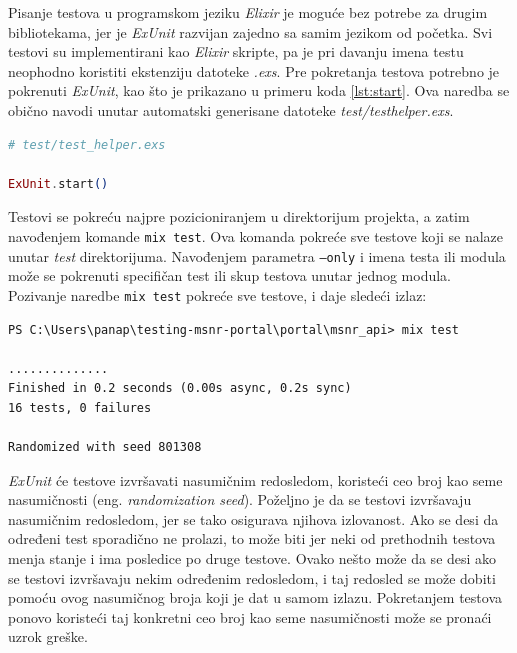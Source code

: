 \documentclass[12pt,oneside]{memoir}
\begin{document}
\par Pisanje testova u programskom jeziku \emph{Elixir} je moguće bez potrebe za drugim bibliotekama, jer je \emph{ExUnit} razvijan zajedno sa samim jezikom od početka. Svi testovi su implementirani kao \emph{Elixir} skripte, pa je pri davanju imena testu neophodno koristiti ekstenziju datoteke \emph{.exs}. Pre pokretanja testova potrebno je pokrenuti \emph{ExUnit}, kao što je prikazano u primeru koda \ref{lst:start}. Ova naredba se obično navodi unutar automatski generisane datoteke \emph{test/test{\textunderscore}helper.exs}.  \\

\begin{minipage}{\linewidth}
\begin{lstlisting}[language=elixir, basicstyle=\small, caption={Pokretanje ExUnit},captionpos=b, label={lst:start}]
# test/test_helper.exs

ExUnit.start()
\end{lstlisting}
\end{minipage}

\par Testovi se pokreću najpre pozicioniranjem u direktorijum projekta, a zatim navođenjem komande \texttt{mix test}. Ova komanda pokreće sve testove koji se nalaze unutar \emph{test} direktorijuma. Navođenjem parametra \texttt{---only} i imena testa ili modula može se pokrenuti specifičan test ili skup testova unutar jednog modula. Pozivanje naredbe \texttt{mix test} pokreće sve testove, i daje sledeći izlaz:  

\begin{minipage}{\linewidth}
\begin{lstlisting}[style=DOS]
PS C:\Users\panap\testing-msnr-portal\portal\msnr_api> mix test

..............
Finished in 0.2 seconds (0.00s async, 0.2s sync)
16 tests, 0 failures

Randomized with seed 801308
\end{lstlisting}
\end{minipage}

\par \emph{ExUnit} će testove izvršavati nasumičnim redosledom, koristeći ceo broj kao seme nasumičnosti (eng. \emph{randomization seed}). Poželjno je da se testovi izvršavaju nasumičnim redosledom, jer se tako osigurava njihova izlovanost. Ako se desi da određeni test sporadično ne prolazi, to može biti jer neki od prethodnih testova menja stanje i ima posledice po druge testove. Ovako nešto može da se desi ako se testovi izvršavaju nekim određenim redosledom, i taj redosled se može dobiti pomoću ovog nasumičnog broja koji je dat u samom izlazu. Pokretanjem testova ponovo koristeći taj konkretni ceo broj kao seme nasumičnosti može se pronaći uzrok greške. 
\end{document}
